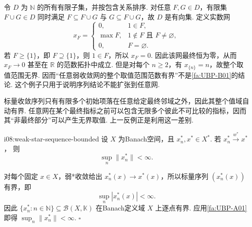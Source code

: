 \begin{FACounterexample}[任意收敛网的整个取值范围可以无界]\label{i08:arbitrary-net-unbounded-range}
令 \(\displaystyle D\) 为 \(\displaystyle \mathbb N\) 的所有有限子集，并按包含关系排序. 对任意 \(\displaystyle F,G\in D\)，有限集 \(\displaystyle F\cup G\in D\) 同时满足 \(\displaystyle F\subseteq F\cup G\) 与 \(\displaystyle G\subseteq F\cup G\)，故 \(\displaystyle D\) 是有向集. 定义实数网
\[
x_F=
\begin{cases}
0,&1\in F,\\
\max F,&1\notin F\text{ 且 }F\neq\varnothing,\\
0,&F=\varnothing.
\end{cases}
\]
若 \(\displaystyle F\geqslant\{1\}\)，即 \(\displaystyle F\supseteq\{1\}\)，则 \(\displaystyle 1\in F\)，所以 \(\displaystyle x_F=0\). 因此该网最终恒为零，从而 \(\displaystyle x_F\to0\) 甚至在 \(\displaystyle \mathbb R\) 的范数拓扑中成立. 但是对每个 \(\displaystyle n\geqslant2\)，有 \(\displaystyle x_{\{n\}}=n\)，故整个取值范围无界. 因而“任意弱收敛网的整个取值范围范数有界”不是\autoref{fa:UBP-B01}的结论. 这个例子只用于说明序列结论不能扩张到任意网.
\end{FACounterexample}

\begin{FARemark}[为什么序列与任意网不同]
标量收敛序列只有有限多个初始项落在任意给定最终邻域之外，因此其整个值域自动有界. 任意网在某个最终指标之前可以包含无限多个彼此不可比较的指标，因而其“非最终部分”可以产生无界取值. 上一反例正是利用这一差别.
\end{FARemark}

\begin{FACorollary}{i08:weak-star-sequence-bounded}
设 \(\displaystyle X\) 为Banach空间，且 \(\displaystyle x_n^*,x^*\in X^*\). 若
\(\displaystyle x_n^*\overset{w^*}{\longrightarrow}x^*\)，
则
\[
\sup_n\|x_n^*\|<\infty.
\]
\end{FACorollary}

\begin{FAProof}
对每个固定 \(\displaystyle x\in X\)，弱*收敛给出 \(\displaystyle x_n^*(x)\to x^*(x)\)，所以标量序列 \(\displaystyle (x_n^*(x))\) 有界，即
\[
\sup_n|x_n^*(x)|<\infty.
\]
因此 \(\displaystyle \{x_n^*:n\in\mathbb N\}\subseteq\mathcal B(X,\mathbb K)\) 在Banach定义域 \(\displaystyle X\) 上逐点有界. 应用\autoref{fa:UBP-A01}即得 \(\displaystyle \sup_n\|x_n^*\|<\infty\).
\hfill\(\square\)
\end{FAProof}

